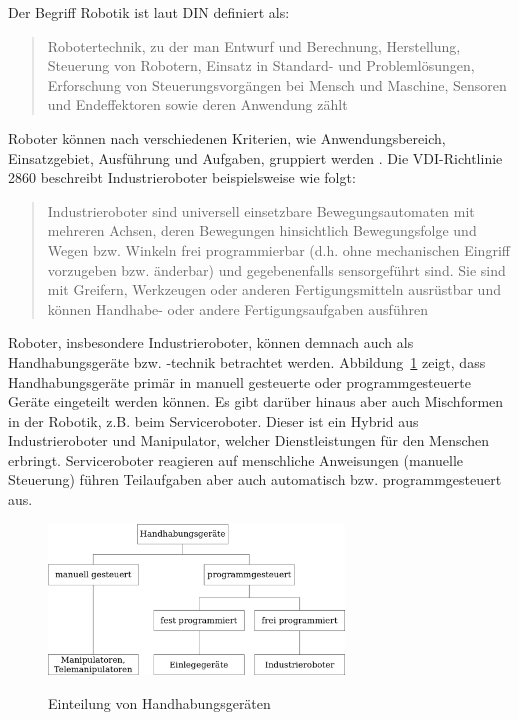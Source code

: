 \documentclass[11pt,ngerman,parskip=half]{scrartcl}
\begin{document}
Der Begriff Robotik ist laut DIN definiert als:
\blockquote[{\cite[DIN EN ISO 8373, zitiert nach][39]
{hesse_taschenbuch_2016}}]{Robotertechnik, zu der man Entwurf und
Berechnung, Herstellung, Steuerung von Robotern, Einsatz in Standard- und
Problemlösungen, Erforschung von Steuerungsvorgängen bei Mensch und Maschine,
Sensoren und Endeffektoren sowie deren Anwendung zählt}.
Roboter können nach verschiedenen Kriterien, wie Anwendungsbereich,
Einsatzgebiet, Ausführung und Aufgaben, gruppiert werden
\parencite[vgl.][25\psq]{hesse_taschenbuch_2016}. Die VDI-Richtlinie 2860
beschreibt Industrieroboter beispielsweise wie folgt:
\blockquote[{\cite[VDI-Richtlinie 2860, zitiert nach][16]
{weber_industrieroboter:_2017}}]{Industrieroboter sind universell
einsetzbare Bewegungsautomaten mit mehreren Achsen, deren Bewegungen
hinsichtlich Bewegungsfolge und Wegen bzw. Winkeln frei programmierbar (d.h.
ohne mechanischen Eingriff vorzugeben bzw. änderbar) und gegebenenfalls
sensorgeführt sind. Sie sind mit Greifern, Werkzeugen oder anderen
Fertigungsmitteln ausrüstbar und können Handhabe- oder andere
Fertigungsaufgaben ausführen}.

Roboter, insbesondere Industrieroboter, können demnach auch als
Handhabungsgeräte bzw. -technik betrachtet werden.
Abbildung~\ref{img:john2} zeigt, dass
Handhabungsgeräte primär in manuell gesteuerte oder programmgesteuerte Geräte
eingeteilt werden können. Es gibt darüber hinaus aber auch Mischformen in der
Robotik, z.B. beim Serviceroboter. Dieser ist ein Hybrid aus Industrieroboter
und Manipulator, welcher Dienstleistungen für den Menschen erbringt.
Serviceroboter reagieren auf menschliche Anweisungen (manuelle Steuerung)
führen Teilaufgaben aber auch automatisch bzw. programmgesteuert aus.
\parencite[vgl.][15--17]{weber_industrieroboter:_2017}

\begin{figure}[H]
  \centering
  \includegraphics[width=0.7\textwidth]{src/img/john2.png}
  \caption{Einteilung von Handhabungsgeräten}
  \label{img:john2}
  \parencite[][16]{weber_industrieroboter:_2017}
\end{figure}
\end{document}

